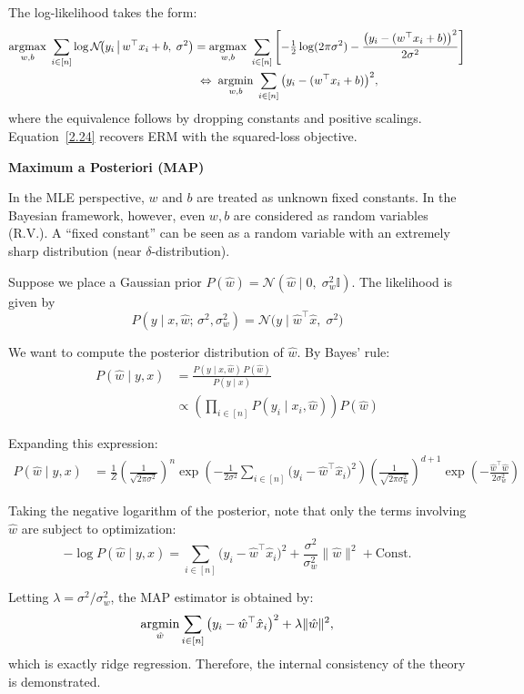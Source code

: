 \documentclass[../main]{subfiles}
\begin{document}
The log-likelihood takes the form:
\begin{align}
  \mathop{\mathrm{argmax}}_{w,b}\; \sum_{i\in[n]}\log \mathcal N\!\big(y_i \,\big|\, w^\top x_i + b,\; \sigma^2\big)
  &= \mathop{\mathrm{argmax}}_{w,b}\; \sum_{i\in[n]}
     \left[
       -\tfrac{1}{2}\log(2\pi\sigma^2)
       - \frac{\big(y_i-(w^\top x_i+b)\big)^2}{2\sigma^2}
     \right]\notag\\
  &\;\Leftrightarrow\; \mathop{\mathrm{argmin}}_{w,b}\; \sum_{i\in[n]}\big(y_i-(w^\top x_i+b)\big)^2, \label{2.24}
\end{align}
where the equivalence follows by dropping constants and positive scalings. 
Equation~\eqref{2.24} recovers ERM with the squared-loss objective.
\begin{example}\textbf{Maximum a Posteriori (MAP)}
\end{example}
  In the MLE perspective, $w$ and $b$ are treated as unknown fixed constants. 
  In the Bayesian framework, however, even $w,b$ are considered as random variables (R.V.). 
  A  ``fixed constant'' can be seen as a random variable with an extremely sharp distribution (near $\delta$-distribution).
  
  Suppose we place a Gaussian prior $
    P(\hat w) = \mathcal N(\hat w \mid 0,\; \sigma_w^2 \mathbb I)$.
  The likelihood is given by
  \begin{equation}
      P(y \mid x, \hat w;\, \sigma^2, \sigma_w^2) = \mathcal N\!\big(y \mid \hat w^\top \hat x,\; \sigma^2\big)
  \end{equation}
  
  We want to compute the posterior distribution of $\hat w$. By Bayes' rule:
  \begin{align*}
    P(\hat w \mid y,x) 
    &= \frac{P(y \mid x, \hat w)\, P(\hat w)}{P(y \mid x)} \\
    &\propto \left( \prod_{i\in[n]} P(y_i \mid x_i, \hat w) \right) P(\hat w)
  \end{align*}
  
  Expanding this expression:
  \begin{align*}
    P(\hat w \mid y,x) 
    &= \frac{1}{Z}
       \left(\frac{1}{\sqrt{2\pi\sigma^2}}\right)^n
       \exp\!\left(-\frac{1}{2\sigma^2}\sum_{i\in[n]} \big(y_i-\hat w^\top \hat x_i\big)^2\right) 
       \left(\frac{1}{\sqrt{2\pi\sigma_w^2}}\right)^{d+1}
       \exp\!\left(-\frac{\hat w^\top \hat w}{2\sigma_w^2}\right)
  \end{align*}
  
  Taking the negative logarithm of the posterior, note that only the terms involving $\hat w$ are subject to optimization:
  \[
    -\log P(\hat w \mid y,x) 
    = \sum_{i\in[n]} \big(y_i-\hat w^\top \hat x_i\big)^2 
      + \frac{\sigma^2}{\sigma_w^2} \|\hat w\|^2 + \text{Const}.
  \]
  
  Letting $\lambda = \sigma^2/\sigma_w^2$, the MAP estimator is obtained by:
  \begin{equation}
      \mathop{\mathrm{argmin}}_{\hat w} \sum_{i\in[n]} \big(y_i-\hat w^\top \hat x_i\big)^2 + \lambda \|\hat w\|^2,
  \end{equation}
  which is exactly ridge regression. Therefore, the internal consistency of the theory is demonstrated.
\end{document}
